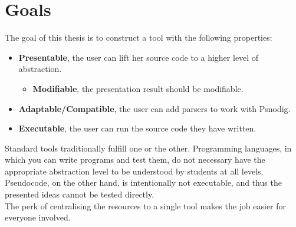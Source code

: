 

\section{Goals}

The goal of this thesis is to construct a tool with the following properties:

\begin{itemize}
    \item \textbf{Presentable}, the user can lift her source code to a higher level of abstraction.
    \begin{itemize}
        \item \textbf{Modifiable}, the presentation result should be modifiable.
    \end{itemize}
    \item \textbf{Adaptable/Compatible}, the user can add parsers to work with Psnodig.
    \item \textbf{Executable}, the user can run the source code they have written.
\end{itemize}


Standard tools traditionally fulfill one or the other. Programming languages, in which you can write programs and test them, do not necessary have the appropriate abstraction level to be understood by students at all levels. Pseudocode, on the other hand, is intentionally not executable, and thus the presented ideas cannot be tested directly. \hfill \\

The perk of centralising the resources to a single tool makes the job easier for everyone involved. \hfill \\

